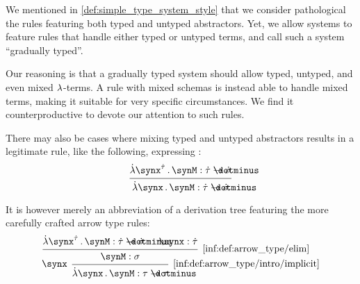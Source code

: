 \begin{remark}\label{rem:mixed_terms_and_typing_style}
  We mentioned in \cref{def:simple_type_system_style} that we consider pathological the rules featuring both typed and untyped abstractors. Yet, we allow systems to feature  rules that handle either typed or untyped terms, and call such a system \enquote{gradually typed}.

  Our reasoning is that a gradually typed system should allow typed, untyped, and even mixed \( {\mathrm \lambda} \)-terms. A rule with mixed schemas is instead able to  handle mixed terms, making it suitable for very specific circumstances. We find it counterproductive to devote our attention to such rules.

  There may also be cases where mixing typed and untyped abstractors results in a legitimate rule, like the following, expressing :
  \begin{equation*}
    \begin{prooftree}
      \hypo{ \qabs {\synx^{\syn\tau}} \synM: \syn\tau \synimplies \syn\sigma }
      \infer1{ \qabs \synx \synM: \syn\tau \synimplies \syn\sigma }
    \end{prooftree}
  \end{equation*}

  It is however merely an abbreviation of a derivation tree featuring the more carefully crafted arrow type rules:
  \begin{equation*}
    \begin{prooftree}
      \hypo{ \qabs {\synx^{\syn\tau}} \synM: \syn\tau \synimplies \syn\sigma }
      \hypo{ \synx: \syn\tau }
      \infer2[\ref{inf:def:arrow_type/elim}]{ \synM: \sigma }
      \infer[left label=\( \synx \)]1[\ref{inf:def:arrow_type/intro/implicit}]{ \qabs \synx \synM: \tau \synimplies \tau }
    \end{prooftree}
  \end{equation*}
\end{remark}

